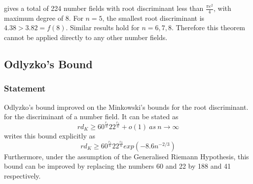 \documentclass[12pt]{extarticle}
\newcommand{\<}{\langle}
\renewcommand{\>}{\rangle}
\theoremstyle{definition}
\begin{document}
\cite{JONE2} gives a total of 224 number fields with root discriminant less than $ \frac{\pi e^2}{4}$, with maximum degree of $8$.  For $n=5$, the smallest root discriminant is $4.38 > 3.82 = f(8)$. Similar results hold for $n = 6,7,8$. Therefore this theorem cannot be applied directly to any other number fields. 
\subsection{Odlyzko's Bound}
\subsubsection*{Statement}
Odlyzko's bound \cite{ODL1990} improved on the Minkowski's bounds for the root discriminant. for the discriminant of a number field. It can be stated as  
\begin{equation}
rd_K\geqslant 60^{\frac{r_1}{n}}22^{\frac{r_2}{n}}+o(1)\:as\:n\rightarrow \infty   
\end{equation}
\cite{MORENO} writes this bound explicitly as 
\begin{equation}
rd_K\geqslant 60^{\frac{r_1}{n}}22^{\frac{r_2}{n}}exp\left(-8.6n^{-2/3}\right)
\end{equation}
Furthermore, under the assumption of the Generalised Riemann Hypothesis, 
this bound can be improved by replacing the numbers 60 and 22 by 188 and 41 respectively. 
\end{document}
